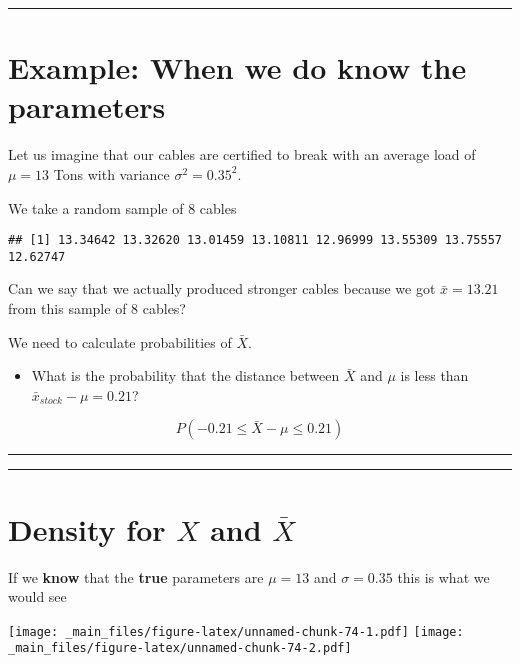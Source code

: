 \documentclass[
]{book}
\providecommand{\tightlist}{%
  \setlength{\itemsep}{0pt}\setlength{\parskip}{0pt}}
\begin{document}
\begin{center}\rule{0.5\linewidth}{0.5pt}\end{center}

\hypertarget{example-when-we-do-know-the-parameters}{%
\section{Example: When we do know the parameters}\label{example-when-we-do-know-the-parameters}}

Let us imagine that our cables are certified to break with an average load of \(\mu = 13\) Tons with variance \(\sigma^2=0.35^2\).

We take a random sample of \(8\) cables

\begin{verbatim}
## [1] 13.34642 13.32620 13.01459 13.10811 12.96999 13.55309 13.75557 12.62747
\end{verbatim}

Can we say that we actually produced stronger cables because we got \(\bar{x}=13.21\) from this sample of \(8\) cables?

We need to calculate probabilities of \(\bar{X}\).

\begin{itemize}
\tightlist
\item
  What is the probability that the distance between \(\bar{X}\) and \(\mu\) is less than \(\bar{x}_{stock}-\mu=0.21\)?
\end{itemize}

\[P(- 0.21\leq \bar{X}-\mu \leq 0.21)\]

\begin{center}\rule{0.5\linewidth}{0.5pt}\end{center}

\begin{center}\rule{0.5\linewidth}{0.5pt}\end{center}

\hypertarget{density-for-x-and-barx}{%
\section{\texorpdfstring{Density for \(X\) and \(\bar{X}\)}{Density for X and \textbackslash bar\{X\}}}\label{density-for-x-and-barx}}

If we \textbf{know} that the \textbf{true} parameters are \(\mu=13\) and \(\sigma=0.35\) this is what we would see

\texttt{[image: \_main\_files/figure-latex/unnamed-chunk-74-1.pdf]} \texttt{[image: \_main\_files/figure-latex/unnamed-chunk-74-2.pdf]}
\end{document}
